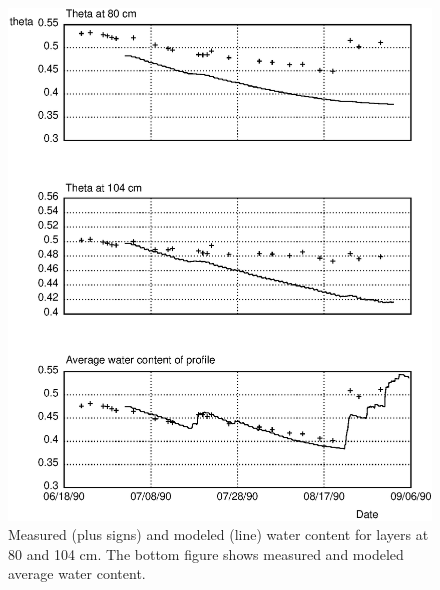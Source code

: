 \begin{figure}
\centerline{
\includegraphics{psfig/mesmod2.eps}
}
\label{fig:mesmodtheta2}
\caption{Measured (plus signs) and modeled (line) water content for layers 
at 80 and 104 cm. The bottom figure shows measured and modeled average water content.}
\end{figure}

